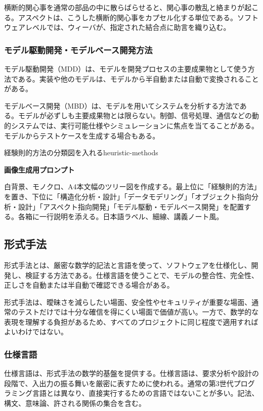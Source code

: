 \documentclass[a4paper,11pt]{ltjsarticle}
\newcommand{\prompt}[1]{\par\noindent\textbf{画像生成用プロンプト}\par\small #1\normalsize}
\begin{document}
横断的関心事を通常の部品の中に散らばらせると、関心事の散乱と絡まりが起こる。アスペクトは、こうした横断的関心事をカプセル化する単位である。ソフトウェアレベルでは、ウィーバが、指定された結合点に助言を織り込む。

\subsubsection{モデル駆動開発・モデルベース開発方法}
モデル駆動開発（MDD）は、モデルを開発プロセスの主要成果物として使う方法である。実装や他のモデルは、モデルから半自動または自動で変換されることがある。

モデルベース開発（MBD）は、モデルを用いてシステムを分析する方法である。モデルが必ずしも主要成果物とは限らない。制御、信号処理、通信などの動的システムでは、実行可能仕様やシミュレーションに焦点を当てることがある。モデルからテストケースを生成する場合もある。

\begin{todobox}{経験則的方法の分類図を入れる}{heuristic-methods}
\prompt{白背景、モノクロ、A4本文幅のツリー図を作成する。最上位に「経験則的方法」を置き、下位に「構造化分析・設計」「データモデリング」「オブジェクト指向分析・設計」「アスペクト指向開発」「モデル駆動・モデルベース開発」を配置する。各箱に一行説明を添える。日本語ラベル、細線、講義ノート風。}
\end{todobox}

\subsection{形式手法}
形式手法とは、厳密な数学的記法と言語を使って、ソフトウェアを仕様化し、開発し、検証する方法である。仕様言語を使うことで、モデルの整合性、完全性、正しさを自動または半自動で確認できる場合がある。

形式手法は、曖昧さを減らしたい場面、安全性やセキュリティが重要な場面、通常のテストだけでは十分な確信を得にくい場面で価値が高い。一方で、数学的な表現を理解する負担があるため、すべてのプロジェクトに同じ程度で適用すればよいわけではない。

\subsubsection{仕様言語}
仕様言語は、形式手法の数学的基盤を提供する。仕様言語は、要求分析や設計の段階で、入出力の振る舞いを厳密に表すために使われる。通常の第3世代プログラミング言語とは異なり、直接実行するための言語ではないことが多い。記法、構文、意味論、許される関係の集合を含む。
\end{document}
